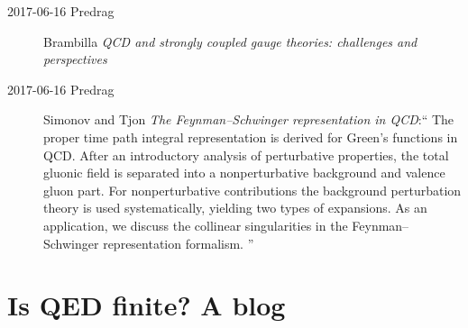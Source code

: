 \begin{description}
\item[2017-06-16 Predrag]
Brambilla \etal{}
{\em {QCD} and strongly coupled gauge theories: challenges and perspectives}

\item[2017-06-16 Predrag]
Simonov and Tjon
{\em The {Feynman–Schwinger} representation in {QCD}}:``
The proper time path integral representation is derived for Green's
functions in QCD. After an introductory analysis of perturbative
properties, the total gluonic field is separated into a nonperturbative
background and valence gluon part. For nonperturbative contributions the
background perturbation theory is used systematically, yielding two types
of expansions. As an application, we discuss the collinear singularities
in the Feynman–Schwinger representation formalism.
''




\end{description}

\newpage
\section{Is QED finite? A blog}
\label{sect:finiteBlog}

